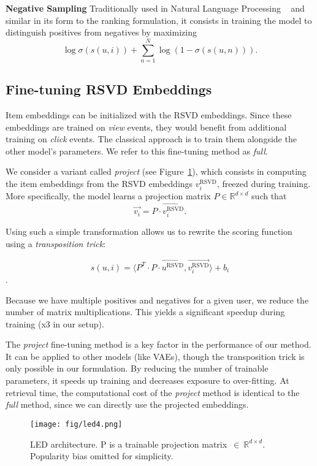 \documentclass[sigconf]{acmart}
\begin{document}
\textbf{Negative Sampling} Traditionally used in Natural Language Processing ~\cite{NIPS2013_5021} and similar in its form to the ranking formulation, it consists in training the model to distinguish positives from negatives by maximizing
$$
\log \sigma(s(u, i)) + \sum_{n=1}^N \log \left( 1 - \sigma(s(u, n)) \right).
$$


\subsection{Fine-tuning RSVD Embeddings}
\label{subsec:fine-tuning-svd-embeddings}

Item embeddings can be initialized with the RSVD embeddings. Since these embeddings are trained on \emph{view} events, they would benefit from additional training on \emph{click} events. The classical approach is to train them alongside the other model's parameters. We refer to this fine-tuning method as \emph{full}. 

We consider a variant called \emph{project} (see Figure~\ref{fig:diagram-learning-led}), which consists in computing the item embeddings from the RSVD embeddings $ v_i^{\text{RSVD}} $, freezed during training. More specifically, the model learns a projection matrix $ P \in \mathbb{R}^{d \times d} $ such that
$$ 
\vec{v_i} = P \cdot \overrightarrow{v_i^{\text{RSVD}}}.
$$

Using such a simple transformation allows us to rewrite the scoring function using a \emph{transposition trick}:



$$ s(u, i) = \langle P^T \cdot P \cdot \overrightarrow{u^{\text{RSVD}}}, \overrightarrow{v_i^{\text{RSVD}}} \rangle + b_i $$. 

Because we have multiple positives and negatives for a given user, we reduce the number of matrix multiplications. This yields a significant speedup during training (x3 in our setup).

The \emph{project} fine-tuning method is a key factor in the performance of our method. It can be applied to other models (like VAEs), though the transposition trick is only possible in our formulation. By reducing the number of trainable parameters, it speeds up training and decreases exposure to over-fitting. At retrieval time, the computational cost of the \emph{project} method is identical to the \emph{full} method, since we can directly use the projected embeddings.

\begin{figure}[t]
\centering
\texttt{[image: fig/led4.png]}
\caption{LED architecture. P is a trainable projection matrix~$\in~\mathbb{R}^{d \times d}$. Popularity bias omitted for simplicity.}
\label{fig:diagram-learning-led}
\end{figure}
\end{document}
